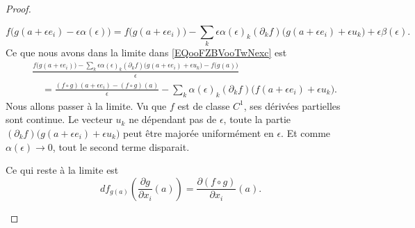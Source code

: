 \begin{proof}
\begin{subproof}
            \begin{equation}
                f\big( g(a+\epsilon e_i)-\epsilon\alpha(\epsilon) \big)=f\big( g(a+\epsilon e_i) \big)-\sum_k\epsilon\alpha(\epsilon)_k(\partial_kf)\big( g(a+\epsilon e_i)+\epsilon u_k \big)+\epsilon\beta(\epsilon).
            \end{equation}
            Ce que nous avons dans la limite dans \eqref{EQooFZBVooTwNexc} est
            \begin{subequations}
                \begin{align}
                    &\frac{ f\big( g(a+\epsilon e_i)\big)-\sum_k\epsilon\alpha(\epsilon)_k (\partial_kf)\big( g(a+\epsilon e_i)+\epsilon u_k \big)-f\big( g(a) \big) }{ \epsilon }\\
                    &\quad=\frac{ (f\circ g)(a+\epsilon e_i)-(f\circ g)(a) }{ \epsilon }
                   -\sum_k\alpha(\epsilon)_k(\partial_kf)\big( f(a+\epsilon e_i)+\epsilon u_k \big).
                \end{align}
            \end{subequations}
            Nous allons passer à la limite. Vu que \( f\) est de classe \( C^1\), ses dérivées partielles sont continue. Le vecteur \( u_k\) ne dépendant pas de \( \epsilon\), toute la partie \( (\partial_kf)\big( g(a+\epsilon e_i)+\epsilon u_k \big)\) peut être majorée uniformément en \( \epsilon\). Et comme \( \alpha(\epsilon)\to 0\), tout le second terme disparait.

            Ce qui reste à la limite est 
            \begin{equation}
                df_{g(a)}\left( \frac{ \partial g }{ \partial x_i }(a) \right)=\frac{ \partial (f\circ g) }{ \partial x_i }(a).
            \end{equation}
    \end{subproof}
\end{proof}


